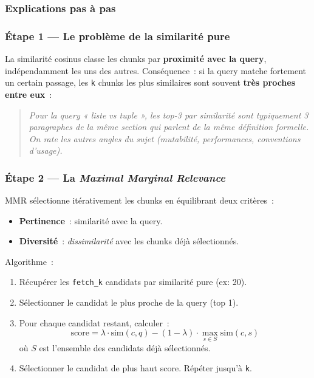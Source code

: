 \documentclass[11pt,a4paper]{article}
\begin{document}
\subsubsection{Explications pas à pas}

\subsubsection*{Étape 1 — Le problème de la similarité pure}

La similarité cosinus classe les chunks par \textbf{proximité avec la
query}, indépendamment les uns des autres. Conséquence~: si la query
matche fortement un certain passage, les \texttt{k} chunks les plus
similaires sont souvent \textbf{très proches entre eux}~:

\begin{quote}\itshape
Pour la query \emph{« liste vs tuple »}, les top-3 par similarité sont
typiquement 3 paragraphes de la \emph{même section} qui parlent de la
même définition formelle. On rate les autres angles du sujet (mutabilité,
performances, conventions d'usage).
\end{quote}

\subsubsection*{Étape 2 — La \emph{Maximal Marginal Relevance}}

MMR sélectionne itérativement les chunks en équilibrant deux critères~:

\begin{itemize}[leftmargin=*]
  \item \textbf{Pertinence}~: similarité avec la query.
  \item \textbf{Diversité}~: \emph{dissimilarité} avec les chunks déjà
        sélectionnés.
\end{itemize}

Algorithme~:
\begin{enumerate}[leftmargin=*]
  \item Récupérer les \texttt{fetch\_k} candidats par similarité pure
        (ex: 20).
  \item Sélectionner le candidat le plus proche de la query (top 1).
  \item Pour chaque candidat restant, calculer~:
        \[
        \text{score} = \lambda \cdot \text{sim}(c, q)
                     - (1-\lambda) \cdot \max_{s \in S} \text{sim}(c, s)
        \]
        où \(S\) est l'ensemble des candidats déjà sélectionnés.
  \item Sélectionner le candidat de plus haut score. Répéter jusqu'à
        \texttt{k}.
\end{enumerate}
\end{document}
